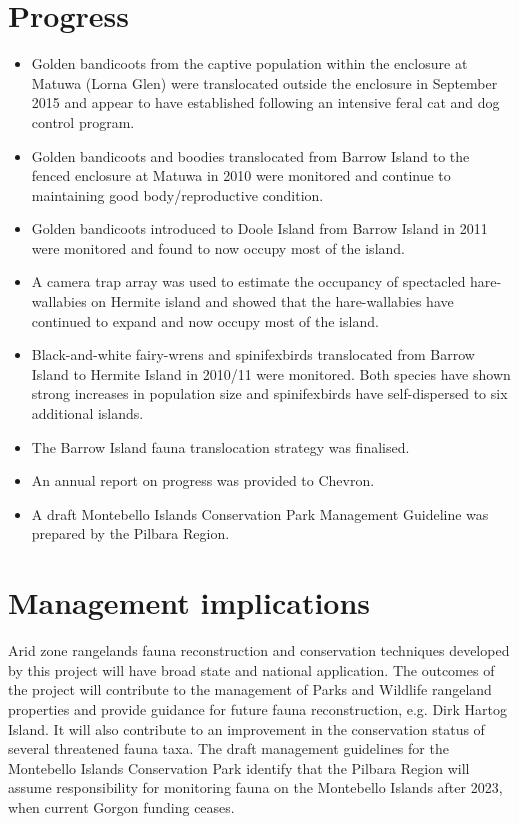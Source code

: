 \documentclass[version=last,
    paper=a4, %
    10pt, %
    usenames,
    dvipsnames,
    oneside, %
    headings=openany, %
    DIV=15 %
]{scrbook}
\begin{document}
\section*{Progress}
\begin{itemize}
\itemsep1pt\parskip0pt
\item
  Golden bandicoots from the captive population within the enclosure at
  Matuwa (Lorna Glen) were translocated outside the enclosure in
  September 2015 and appear to have established following an intensive
  feral cat and dog control program.
\item
  Golden bandicoots and boodies translocated from Barrow Island to the
  fenced enclosure at Matuwa in 2010 were monitored and continue to
  maintaining good body/reproductive condition.
\item
  Golden bandicoots introduced to Doole Island from Barrow Island in
  2011 were monitored and found to now occupy most of the island.
\item
  A camera trap array was used to estimate the occupancy of spectacled
  hare-wallabies on Hermite island and showed that the hare-wallabies
  have continued to expand and now occupy most of the island.
\item
  Black-and-white fairy-wrens and spinifexbirds translocated from Barrow
  Island to Hermite Island in 2010/11 were monitored. Both species have
  shown strong increases in population size and spinifexbirds have
  self-dispersed to six additional islands.
\item
  The Barrow Island fauna translocation strategy was finalised.
\item
  An annual report on progress was provided to Chevron.
\item
  A draft Montebello Islands Conservation Park Management Guideline was
  prepared by the Pilbara Region.
\end{itemize}



\section*{Management implications}
Arid zone rangelands fauna reconstruction and conservation techniques
developed by this project will have broad state and national
application. The outcomes of the project will contribute to the
management of Parks and Wildlife rangeland properties and provide
guidance for future fauna reconstruction, e.g. Dirk Hartog Island. It
will also contribute to an improvement in the conservation status of
several threatened fauna taxa. The draft management guidelines for the
Montebello Islands Conservation Park identify that the Pilbara Region
will assume responsibility for monitoring fauna on the Montebello
Islands after 2023, when current Gorgon funding ceases.
\end{document}
